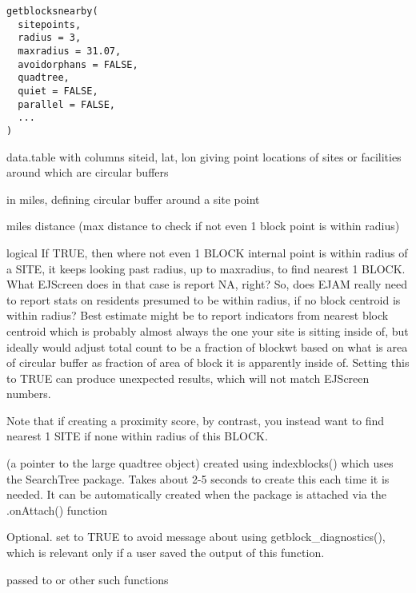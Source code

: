 \documentclass[a4paper]{book}
\begin{document}
%
\begin{Usage}
\begin{verbatim}
getblocksnearby(
  sitepoints,
  radius = 3,
  maxradius = 31.07,
  avoidorphans = FALSE,
  quadtree,
  quiet = FALSE,
  parallel = FALSE,
  ...
)
\end{verbatim}
\end{Usage}
%
\begin{Arguments}
\begin{ldescription}
\item[\code{sitepoints}] data.table with columns siteid, lat, lon giving point locations of sites or facilities around which are circular buffers

\item[\code{radius}] in miles, defining circular buffer around a site point

\item[\code{maxradius}] miles distance (max distance to check if not even 1 block point is within radius)

\item[\code{avoidorphans}] logical If TRUE, then where not even 1 BLOCK internal point is within radius of a SITE,
it keeps looking past radius, up to maxradius, to find nearest 1 BLOCK.
What EJScreen does in that case is report NA, right? So,
does EJAM really need to report stats on residents presumed to be within radius,
if no block centroid is within radius?
Best estimate might be to report indicators from nearest block centroid which is
probably almost always the one your site is sitting inside of,
but ideally would adjust total count to be a fraction of blockwt based on
what is area of circular buffer as fraction of area of block it is apparently inside of.
Setting this to TRUE can produce unexpected results, which will not match EJScreen numbers.

Note that if creating a proximity score, by contrast, you instead want to find nearest 1 SITE if none within radius of this BLOCK.

\item[\code{quadtree}] (a pointer to the large quadtree object)
created using indexblocks() which uses the SearchTree package.
Takes about 2-5 seconds to create this each time it is needed.
It can be automatically created when the package is attached via the .onAttach() function

\item[\code{quiet}] Optional. set to TRUE to avoid message about using getblock\_diagnostics(),
which is relevant only if a user saved the output of this function.

\item[\code{...}] passed to  or other such functions
\end{ldescription}
\end{Arguments}
\end{document}

